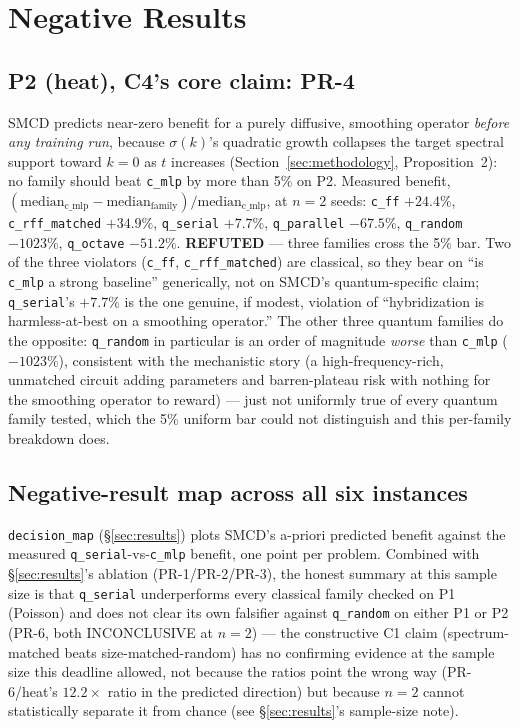 \section{Negative Results}
\label{sec:negative}

\subsection{P2 (heat), C4's core claim: PR-4}
SMCD predicts near-zero benefit for a purely diffusive, smoothing operator
\emph{before any training run}, because $\sigma(k)$'s quadratic growth collapses the
target spectral support toward $k=0$ as $t$ increases (Section~\ref{sec:methodology},
Proposition~2): no family should beat \texttt{c\_mlp} by more than 5\% on P2. Measured
benefit, $(\text{median}_{\text{c\_mlp}}-\text{median}_{\text{family}})/
\text{median}_{\text{c\_mlp}}$, at $n=2$ seeds: \texttt{c\_ff} $+24.4\%$,
\texttt{c\_rff\_matched} $+34.9\%$, \texttt{q\_serial} $+7.7\%$, \texttt{q\_parallel}
$-67.5\%$, \texttt{q\_random} $-1023\%$, \texttt{q\_octave} $-51.2\%$.
\textbf{REFUTED} --- three families cross the 5\% bar. Two of the three violators
(\texttt{c\_ff}, \texttt{c\_rff\_matched}) are classical, so they bear on ``is \texttt{c\_mlp}
a strong baseline'' generically, not on SMCD's quantum-specific claim; \texttt{q\_serial}'s
$+7.7\%$ is the one genuine, if modest, violation of ``hybridization is harmless-at-best
on a smoothing operator.'' The other three quantum families do the opposite:
\texttt{q\_random} in particular is an order of magnitude \emph{worse} than \texttt{c\_mlp}
($-1023\%$), consistent with the mechanistic story (a high-frequency-rich, unmatched
circuit adding parameters and barren-plateau risk with nothing for the smoothing operator
to reward) --- just not uniformly true of every quantum family tested, which the 5\%
uniform bar could not distinguish and this per-family breakdown does.

\subsection{Negative-result map across all six instances}
\texttt{decision\_map} (\S\ref{sec:results}) plots SMCD's a-priori predicted benefit
against the measured \texttt{q\_serial}-vs-\texttt{c\_mlp} benefit, one point per
problem. Combined with \S\ref{sec:results}'s ablation (PR-1/PR-2/PR-3), the honest
summary at this sample size is that \texttt{q\_serial} underperforms every classical
family checked on P1 (Poisson) and does not clear its own falsifier against
\texttt{q\_random} on either P1 or P2 (PR-6, both INCONCLUSIVE at $n=2$) --- the
constructive C1 claim (spectrum-matched beats size-matched-random) has no confirming
evidence at the sample size this deadline allowed, not because the ratios point the
wrong way (PR-6/heat's $12.2\times$ ratio in the predicted direction) but because $n=2$
cannot statistically separate it from chance (see \S\ref{sec:results}'s sample-size
note).


